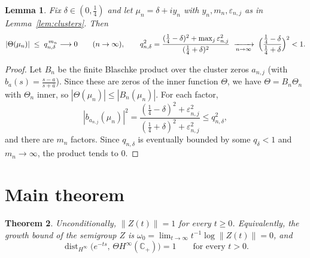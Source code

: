 \documentclass[11pt]{amsart}
\newtheorem{theorem}{Theorem}[section]
\newtheorem{lemma}[theorem]{Lemma}
\theoremstyle{remark}
\newcommand{\Cp}{\mathbb{C}_{+}}
\newcommand{\Hinf}{H^{\infty}(\Cp)}
\newcommand{\dist}{\operatorname{dist}}
\begin{document}
\begin{lemma}\label{lem:smallTheta}
Fix $\delta\in(0,\tfrac14)$ and let $\mu_{n}=\delta+iy_{n}$ with
$y_{n},m_{n},\varepsilon_{n,j}$ as in Lemma~\ref{lem:clusters}. Then
\[
  |\Theta(\mu_{n})|
  \;\le\;
  q_{n,\delta}^{\,m_{n}}
  \longrightarrow 0
  \qquad (n\to\infty),
  \qquad
  q_{n,\delta}^{2}
  =\frac{(\tfrac14-\delta)^{2}+\max_{j}\varepsilon_{n,j}^{2}}
        {(\tfrac14+\delta)^{2}}
  \;\xrightarrow[n\to\infty]{}\;
  \Bigl(\frac{\tfrac14-\delta}{\tfrac14+\delta}\Bigr)^{2}<1 .
\]
\end{lemma}

\begin{proof}
Let $B_{n}$ be the finite Blaschke product over the cluster zeros
$a_{n,j}$ (with $b_{a}(s)=\frac{s-a}{s+\bar a}$). Since these are zeros
of the inner function $\Theta$, we have $\Theta=B_{n}\Theta_{n}$ with
$\Theta_{n}$ inner, so $|\Theta(\mu_{n})|\le|B_{n}(\mu_{n})|$. For each
factor,
\[
  |b_{a_{n,j}}(\mu_{n})|^{2}
  =\frac{(\tfrac14-\delta)^{2}+\varepsilon_{n,j}^{2}}
        {(\tfrac14+\delta)^{2}+\varepsilon_{n,j}^{2}}
  \le q_{n,\delta}^{2},
\]
and there are $m_{n}$ factors. Since $q_{n,\delta}$ is eventually
bounded by some $q_{\delta}<1$ and $m_{n}\to\infty$, the product tends
to $0$.
\end{proof}

\section{Main theorem}

\begin{theorem}\label{thm:main}
Unconditionally, $\|Z(t)\|=1$ for every $t\ge0$. Equivalently, the
growth bound of the semigroup $Z$ is
$\omega_{0}=\lim_{t\to\infty}t^{-1}\log\|Z(t)\|=0$, and
\[
  \dist_{H^{\infty}}\bigl(e^{-ts},\,\Theta\Hinf\bigr)=1
  \qquad\text{for every } t>0 .
\]
\end{theorem}
\end{document}
